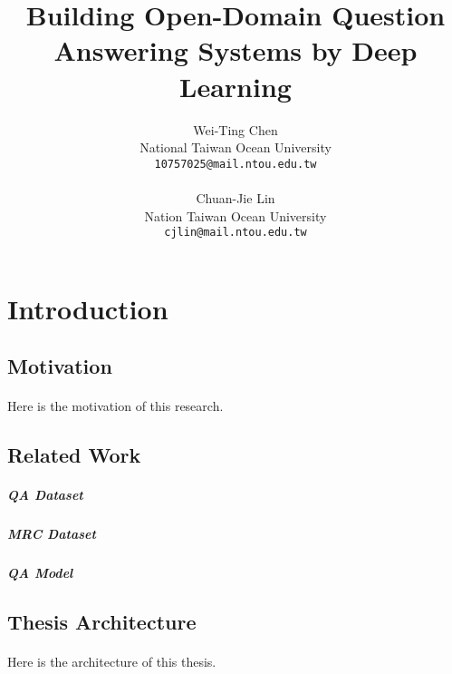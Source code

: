 \documentclass{article}
\title{Building Open-Domain Question Answering Systems by Deep Learning}
\author{
  Wei-Ting Chen\\
  National Taiwan Ocean University\\
  \texttt{10757025@mail.ntou.edu.tw}\\
  \\
  Chuan-Jie Lin\\
  Nation Taiwan Ocean University\\
  \texttt{cjlin@mail.ntou.edu.tw}\\
}
\begin{document}
\maketitle
{}

\newpage

\doublespacing
\tableofcontents
\singlespacing

\newpage

\section{Introduction}

\subsection{Motivation}
\paragraph{}
Here is the motivation of this research.

\subsection{Related Work}
\paragraph{}

\subparagraph{QA Dataset}

\subparagraph{MRC Dataset}

\subparagraph{QA Model}

\subsection{Thesis Architecture}
\paragraph{}
Here is the architecture of this thesis.

\end{document}
